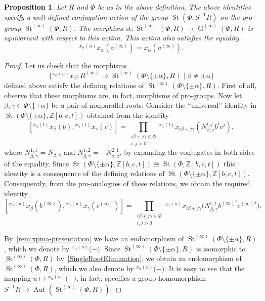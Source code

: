 \documentclass[oneside, 11pt]{amsart}
\numberwithin{equation}{section}
\newtheorem{prop}[lemma]{Proposition}
\theoremstyle{definition}
\theoremstyle{remark}
\DeclareMathOperator\St{St}
\DeclareMathOperator\GG{G}
\DeclareMathOperator\Aut{Aut}
\newcommand{\ZZ}{\mathbb{Z}}
\newcommand{\up}[2]{{^{#1}\!{#2}}}
\begin{document}
\begin{prop}\label{SteinbergLocalAction} 
 Let $R$ and $\Phi$ be as in the above definition.
 The above identities specify a well-defined conjugation action of the group \(\St(\Phi, S^{-1} R)\) on the pro-group \(\St^{(\infty)}(\Phi, R)\).
 The morphism \(\mathrm{st} \colon \St^{(\infty)}(\Phi, R) \to \GG^{(\infty)}(\Phi, R)\) is equivariant with respect to this action.
 This action also satisfies the equality \[\up{x_\alpha(u)}{x_\alpha(a^{(\infty)})} = x_\alpha(a^{(\infty)}).\]
\end{prop}
\begin{proof} 
 Let us check that the morphisms \[\{\up{x_\alpha(u)} x_\beta \colon R^{(\infty)} \to \St^{(\infty)}(\Phi\setminus\{\pm\alpha\}, R) \mid \beta \neq \pm \alpha \}\] defined above satisfy the defining relations of $\St^{(\infty)}(\Phi\setminus\{\pm \alpha\}, R)$. 
 First of all, observe that these morphisms are, in fact, morphisms of pro-groups.
 Now let \(\beta, \gamma \in \Phi \setminus \{\pm \alpha\}\) be a pair of nonparallel roots. %
 Consider the ``universal'' identity in \(\St(\Phi \setminus \{\pm \alpha\}, \mathbb Z[b, c, t])\) obtained from the identity
 \[[\up{x_\alpha(t)}{x_\beta(b)}, \up{x_\alpha(t)}{x_\gamma(c)}] = \prod_{\substack{i\beta + j\gamma \in \Phi\\ i, j > 0}} \up{x_\alpha(t)}{x_{i\beta + j\gamma}(N_{\beta, \gamma}^{i, j} b^i c^j)},\]
 where \(N_{\beta, \gamma}^{1, 1} = N_{\beta, \gamma}\) and \(N_{\beta, \gamma}^{1, 2} = -N_{\gamma, \beta}^{2, 1}\),
 by expanding the conjugates in both sides of the equality.
 Since \(\St(\Phi \setminus \{\pm \alpha\}, \ZZ[b, c, t]) \cong \St(\Phi, \ZZ[b, c, t])\) this identity is a consequence of the defining relations of $\St(\Phi \setminus \{\pm \alpha\}, \ZZ[b,c,t])$.  
 Consequently, from the pro-analogues of these relations, we obtain the required identity
 \[[\up{x_\alpha(u)}{x_\beta(b^{(\infty)})}, \up{x_\alpha(u)}{x_\gamma(c^{(\infty)})}] = \prod_{\substack{i\beta + j\gamma \in \Phi\\ i, j > 0}} \up{x_\alpha(u)}{x_{i\beta + j\gamma}\bigl(N_{\beta, \gamma}^{i, j} {b^{(\infty)}}^i {c^{(\infty)}}^j \bigr)}.\]

 By~\cref{rem:xpma-presentation} we have an endomorphism of $\St^{(\infty)}(\Phi\setminus\{\pm\alpha\}, R)$, which we denote by $\up{x_\alpha(u)}(-)$.
 Since $\St^{(\infty)}(\Phi\setminus\{\pm\alpha\}, R)$ is isomorphic to $\St^{(\infty)}(\Phi, R)$ by~\cref{SingleRootElimination}, we obtain an endomorphism of $\St^{(\infty)}(\Phi, R)$, which we also denote by $\up{x_\alpha(u)}(-)$. It is easy to see that the mapping $u \mapsto \up{x_\alpha(u)}(-)$, in fact, specifies a group homomorphism $S^{-1}R \to \Aut(\St^{(\infty)}(\Phi, R))$. 
 

\end{proof}
\end{document}
